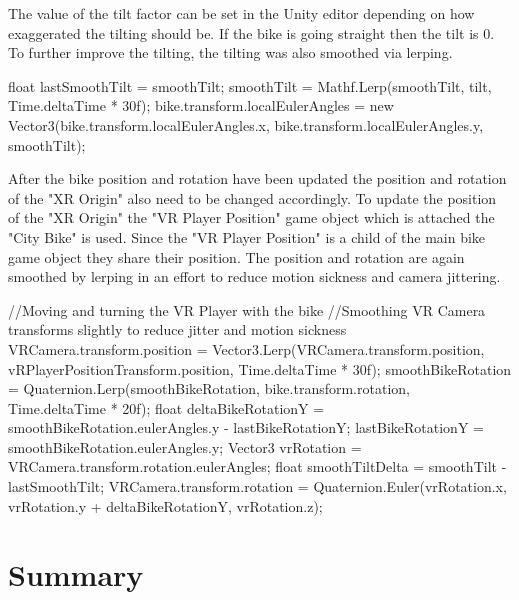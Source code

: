 \documentclass[english,notitlepage,smartquotes]{hgbreport}
\begin{document}
The value of the tilt factor can be set in the Unity editor depending on how exaggerated the tilting should be.
If the bike is going straight then the tilt is 0.
To further improve the tilting, the tilting was also smoothed via lerping.
\begin{CsCode}
	float lastSmoothTilt = smoothTilt;
	smoothTilt = Mathf.Lerp(smoothTilt, tilt, Time.deltaTime * 30f);
	bike.transform.localEulerAngles = new Vector3(bike.transform.localEulerAngles.x, bike.transform.localEulerAngles.y, smoothTilt);
\end{CsCode}
After the bike position and rotation have been updated the position and rotation of the "XR Origin" also need to be changed accordingly.
To update the position of the "XR Origin" the "VR Player Position" game object which is attached the "City Bike" is used.  Since the "VR Player Position" is a child of the main bike game object they share their position.
 The position and rotation are again smoothed by lerping in an effort to reduce motion sickness and camera jittering.
\begin{CsCode}
	//Moving and turning the VR Player with the bike
	//Smoothing VR Camera transforms slightly to reduce jitter and motion sickness
	VRCamera.transform.position = Vector3.Lerp(VRCamera.transform.position, vRPlayerPositionTransform.position, Time.deltaTime * 30f);
	smoothBikeRotation = Quaternion.Lerp(smoothBikeRotation, bike.transform.rotation, Time.deltaTime * 20f);
	float deltaBikeRotationY = smoothBikeRotation.eulerAngles.y - lastBikeRotationY;
	lastBikeRotationY = smoothBikeRotation.eulerAngles.y;
	Vector3 vrRotation = VRCamera.transform.rotation.eulerAngles;
	float smoothTiltDelta = smoothTilt - lastSmoothTilt;
	VRCamera.transform.rotation = Quaternion.Euler(vrRotation.x, vrRotation.y + deltaBikeRotationY, vrRotation.z);
\end{CsCode} 

\chapter{Summary}
\end{document}
